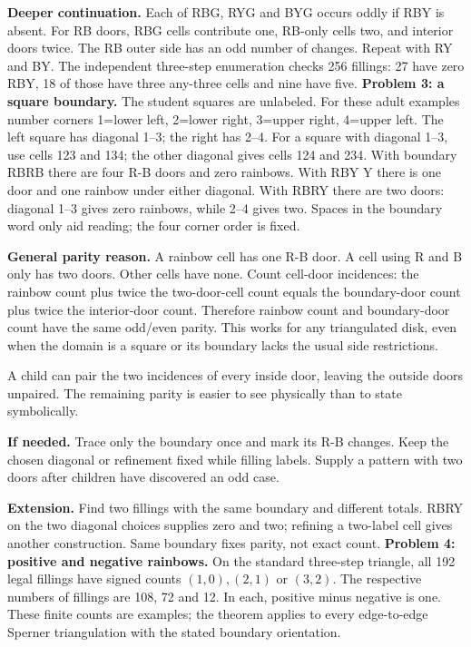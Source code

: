 \documentclass[11pt]{article}
\begin{document}
\textbf{Deeper continuation.} Each of RBG, RYG and BYG occurs oddly if RBY is absent. For RB doors, RBG cells contribute one, RB-only cells two, and interior doors twice. The RB outer side has an odd number of changes. Repeat with RY and BY. The independent three-step enumeration checks 256 fillings: 27 have zero RBY, 18 of those have three any-three cells and nine have five.
\newpage
\textbf{Problem 3: a square boundary.} The student squares are unlabeled. For these adult examples number corners 1=lower left, 2=lower right, 3=upper right, 4=upper left. The left square has diagonal 1--3; the right has 2--4. For a square with diagonal 1--3, use cells 123 and 134; the other diagonal gives cells 124 and 234. With boundary RBRB there are four R-B doors and zero rainbows. With RBY Y there is one door and one rainbow under either diagonal. With RBRY there are two doors: diagonal 1--3 gives zero rainbows, while 2--4 gives two. Spaces in the boundary word only aid reading; the four corner order is fixed.

\textbf{General parity reason.} A rainbow cell has one R-B door. A cell using R and B only has two doors. Other cells have none. Count cell-door incidences: the rainbow count plus twice the two-door-cell count equals the boundary-door count plus twice the interior-door count. Therefore rainbow count and boundary-door count have the same odd/even parity. This works for any triangulated disk, even when the domain is a square or its boundary lacks the usual side restrictions.

A child can pair the two incidences of every inside door, leaving the outside doors unpaired. The remaining parity is easier to see physically than to state symbolically.

\textbf{If needed.} Trace only the boundary once and mark its R-B changes. Keep the chosen diagonal or refinement fixed while filling labels. Supply a pattern with two doors after children have discovered an odd case.

\textbf{Extension.} Find two fillings with the same boundary and different totals. RBRY on the two diagonal choices supplies zero and two; refining a two-label cell gives another construction. Same boundary fixes parity, not exact count.
\newpage
\textbf{Problem 4: positive and negative rainbows.} On the standard three-step triangle, all 192 legal fillings have signed counts \((1,0),(2,1)\) or \((3,2)\). The respective numbers of fillings are 108, 72 and 12. In each, positive minus negative is one. These finite counts are examples; the theorem applies to every edge-to-edge Sperner triangulation with the stated boundary orientation.
\end{document}
